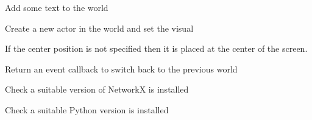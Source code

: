 \documentclass[letterpaper,10pt,english]{sphinxmanual}
\begin{document}

\begin{fulllineitems}
\label{blocks:serge.blocks.utils.addTextToWorld}
Add some text to the world

\end{fulllineitems}


\begin{fulllineitems}
\label{blocks:serge.blocks.utils.addVisualActorToWorld}
Create a new actor in the world and set the visual

If the center position is not specified then it is placed at the center of the screen.

\end{fulllineitems}


\begin{fulllineitems}
\label{blocks:serge.blocks.utils.backToPreviousWorld}
Return an event callback to switch back to the previous world

\end{fulllineitems}


\begin{fulllineitems}
\label{blocks:serge.blocks.utils.checkNetworkXVersion}
Check a suitable version of NetworkX is installed

\end{fulllineitems}


\begin{fulllineitems}
\label{blocks:serge.blocks.utils.checkPythonVersion}
Check a suitable Python version is installed

\end{fulllineitems}
\end{document}
